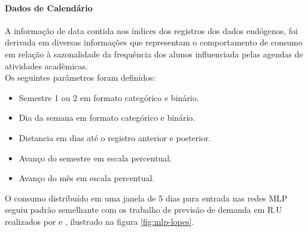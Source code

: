         	\paragraph{Dados de Calendário}
            	A informação de data contida nos índices dos registros dos dados endógenos, foi derivada em diversas informações que representam o comportamento de consumo em relação à sazonalidade da frequência dos alunos influenciada pelas agendas de atividades acadêmicas.\\
            	Os seguintes parâmetros foram definidos:
            	\begin{itemize}
            	    \item Semestre 1 ou 2 em formato categórico e binário.
            	    \item Dia da semana em formato categórico e binário.
            	    \item Distancia em dias até o registro anterior e posterior.
            	    \item Avanço do semestre em escala percentual.
            	    \item Avanço do mês em escala percentual.
            	\end{itemize}
            	
            	O consumo distribuído em uma janela de 5 dias para entrada nas redes MLP seguiu padrão semelhante com os trabalho de previsão de demanda em R.U realizados por \cite{Lopes2008} e \cite{Rocha2011}, ilustrado na figura \ref{fig:mlp-lopes}.
                
